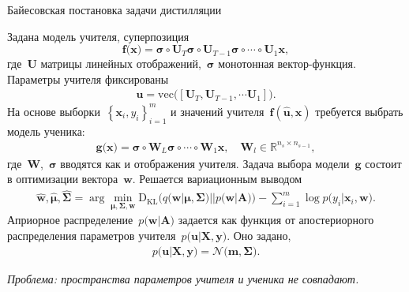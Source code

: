 \documentclass[10pt,pdf,hyperref={unicode}]{beamer}
\begin{document}

\begin{frame}{Байесовская постановка задачи дистилляции}

Задана модель учителя, суперпозиция
\[
\mathbf{f}\bigr(\mathbf{x}\bigr) = \bm{\sigma} \circ \mathbf{U}_T\bm{\sigma} \circ \mathbf{U}_{T-1}\bm{\sigma} \circ \cdots \circ \mathbf{U}_1\mathbf{x},
\]
где~$\mathbf{U}$ матрицы линейных отображений,~$\bm{\sigma}$ монотонная вектор-функция. Параметры учителя фиксированы
\[
\begin{aligned}
\mathbf{u} = \text{vec}\bigr(\left[\mathbf{U}_T, \mathbf{U}_{T-1}, \cdots \mathbf{U}_1\right]\bigr).
\end{aligned}
\]
На основе выборки~$\left\{\mathbf{x}_i, y_i\right\}_{i=1}^{m}$ и значений учителя~$\mathbf{f}(\hat{\mathbf{u}},\mathbf{x})$ требуется выбрать модель ученика:
\[
\begin{aligned}
\mathbf{g}\bigr(\mathbf{x}\bigr) = \bm{\sigma} \circ \mathbf{W}_L\bm{\sigma} \circ \cdots \circ \mathbf{W}_1\mathbf{x}, \quad \mathbf{W}_l \in \mathbb{R}^{n_s \times n_{s-1}},
\end{aligned}
\]
где~$\mathbf{W}$,~$\bm{\sigma}$ вводятся как и отображения учителя. Задача выбора модели~$\mathbf{g}$ состоит в оптимизации вектора~$\mathbf{w}$.  Решается  вариационным выводом
\[
\begin{aligned}
\hat{\mathbf{w}}, \hat{\bm{\mu}}, \hat{\bm{\Sigma}} = \arg \min_{\bm{\mu}, \bm{\Sigma}, \mathbf{w}} \text{D}_{\text{KL}}\bigr(q\bigr(\mathbf{w}|\bm{\mu}, \bm{\Sigma}\bigr)||p\bigr(\mathbf{w}|\mathbf{A}\bigr)\bigr) - \sum_{i=1}^{m}\log p\bigr(y_i|\mathbf{x}_{i}, \mathbf{w}\bigr).
\end{aligned}
\]
Априорное распределение~$p\bigr(\mathbf{w}|\mathbf{A}\bigr)$ задается как функция от апостериорного распределения параметров учителя~$p\bigr(\mathbf{u}|\mathbf{X}, \mathbf{y}\bigr)$.  Оно задано,
\[
\begin{aligned}
p\bigr(\mathbf{u}|\mathbf{X}, \mathbf{y}\bigr) = \mathcal{N}\bigr(\mathbf{m}, \bm{\Sigma}\bigr).
\end{aligned}
\]

{\it \color{red}Проблема: пространства параметров учителя и ученика не совпадают.}
\end{frame}
\end{document}

